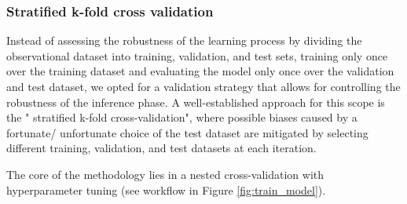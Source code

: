 \subsubsection{Stratified k-fold cross validation}

Instead of assessing the robustness of the learning process by dividing the observational dataset into training, validation, and test sets, training only once over the training dataset and evaluating the model only once over the validation and test dataset, we opted for a validation strategy that allows for controlling the robustness of the inference phase. A well-established approach for this scope is the " stratified k-fold cross-validation", where possible biases caused by a fortunate/ unfortunate choice of the test dataset are mitigated by selecting different training, validation, and test datasets at each iteration. 

The core of the methodology lies in a nested cross-validation with hyperparameter tuning (see workflow in Figure \ref{fig:train_model}). 

